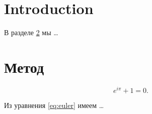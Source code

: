 \documentclass{article}
\begin{document}
\section{Introduction}\label{sec:int}
В разделе \ref{sec:method} мы \dots

\section{Метод}\label{sec:method}
\begin{equation}\label{eq:euler}
e^{i\pi} + 1 = 0.
\end{equation}

Из уравнения \eqref{eq:euler} имеем
\dots
\end{document}

